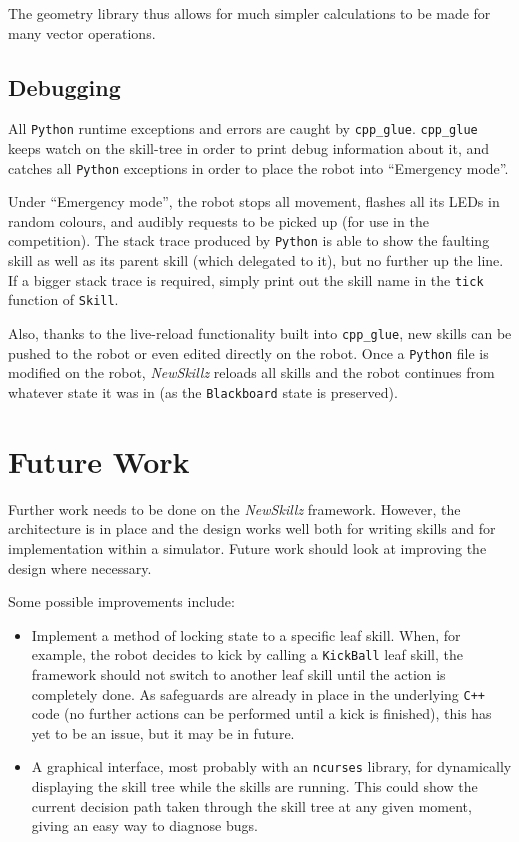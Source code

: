 The geometry library thus allows for much simpler calculations to be made for many vector operations.

\subsection{Debugging} 

All \verb!Python! runtime exceptions and errors are caught by \texttt{cpp\_glue}. \texttt{cpp\_glue} keeps watch on the skill-tree in order to print debug information about it, and catches all \verb!Python! exceptions in order to place the robot into ``Emergency mode''.

Under ``Emergency mode'', the robot stops all movement, flashes all its LEDs in random colours, and audibly requests to be picked up (for use in the competition). The stack trace produced by \verb!Python! is able to show the faulting skill as well as its parent skill (which delegated to it), but no further up the line. If a bigger stack trace is required, simply print out the skill name in the \texttt{tick} function of \texttt{Skill}.

Also, thanks to the live-reload functionality built into \texttt{cpp\_glue}, new skills can be pushed to the robot or even edited directly on the robot. Once a \verb!Python! file is modified on the robot, \textit{NewSkillz} reloads all skills and the robot continues from whatever state it was in (as the \texttt{Blackboard} state is preserved).

\section{Future Work}

Further work needs to be done on the \textit{NewSkillz} framework. However, the architecture is in place and the design works well both for writing skills and for implementation within a simulator. Future work should look at improving the design where necessary.

Some possible improvements include:
\begin{itemize}
\item Implement a method of locking state to a specific leaf skill. When, for example, the robot decides to kick by calling a \texttt{KickBall} leaf skill, the framework should not switch to another leaf skill until the action is completely done. As safeguards are already in place in the underlying \verb!C++! code (no further actions can be performed until a kick is finished), this has yet to be an issue, but it may be in future.
\item A graphical interface, most probably with an \texttt{ncurses} library, for dynamically displaying the skill tree while the skills are running. This could show the current decision path taken through the skill tree at any given moment, giving an easy way to diagnose bugs.
\end{itemize}

